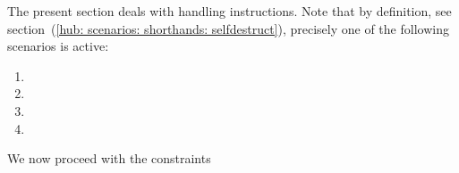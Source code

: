 \begin{center}
\end{center}
The present section deals with handling  instructions.
Note that by definition, see section~(\ref{hub: scenarios: shorthands: selfdestruct}), precisely one of the following scenarios is active:
\begin{multicols}{2}
	\begin{enumerate}
		\item \scenSelfdestructException
		\item \scenSelfdestructWillRevert
		\item \scenSelfdestructWontRevertAlreadyMarked
		\item \scenSelfdestructWontRevertNotYetMarked
	\end{enumerate}
\end{multicols}
\noindent We now proceed with the constraints
